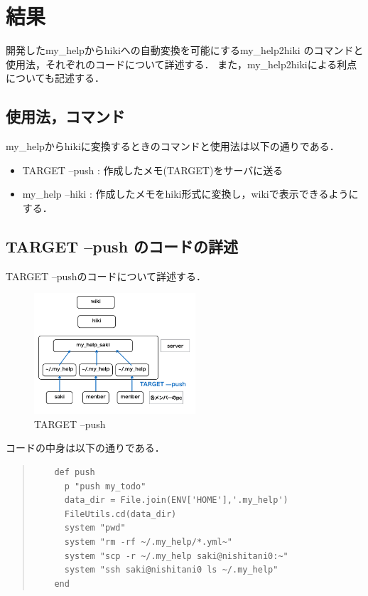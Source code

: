 \section{結果}
開発したmy\_helpからhikiへの自動変換を可能にするmy\_help2hiki
のコマンドと使用法，それぞれのコードについて詳述する．
また，my\_help2hikiによる利点についても記述する．

\subsection{使用法，コマンド}
my\_helpからhikiに変換するときのコマンドと使用法は以下の通りである．
\begin{itemize}
\item TARGET --push : 作成したメモ(TARGET)をサーバに送る
\end{itemize}  
\begin{itemize}
\item my\_help --hiki : 作成したメモをhiki形式に変換し，wikiで表示できるようにする．
\end{itemize}

\subsection{TARGET --push のコードの詳述}
TARGET --pushのコードについて詳述する．
\begin{figure}[htbp]\begin{center}
\includegraphics[width=6cm,bb=100 100 600 700]{my_help2hiki_saki.012.png}
\caption{TARGET --push}
\label{default}\end{center}\end{figure}

コードの中身は以下の通りである．
\begin{quote}\begin{verbatim}
    def push
      p "push my_todo"
      data_dir = File.join(ENV['HOME'],'.my_help')
      FileUtils.cd(data_dir)
      system "pwd"
      system "rm -rf ~/.my_help/*.yml~"
      system "scp -r ~/.my_help saki@nishitani0:~"
      system "ssh saki@nishitani0 ls ~/.my_help" 
    end
\end{verbatim}\end{quote}

